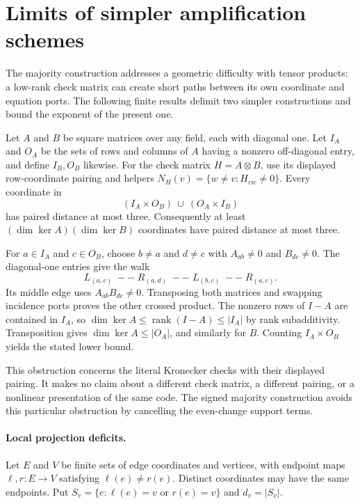 \section{Limits of simpler amplification schemes}\label{sec:barriers}

The majority construction addresses a geometric difficulty with tensor
products: a low-rank check matrix can create short paths between its
own coordinate and equation ports. The following finite results delimit
two simpler constructions and bound the exponent of the present one.

\begin{proposition}\label{prop:tensor-barrier}
Let $A$ and $B$ be square matrices over any field, each with diagonal
one. Let $I_A$ and $O_A$ be the sets of rows and columns of $A$ having
a nonzero off-diagonal entry, and define $I_B,O_B$ likewise. For the
check matrix $H=A\otimes B$, use its displayed row-coordinate pairing
and helpers $N_H(v)=\{w\ne v:H_{vw}\ne0\}$.
Every coordinate in
\[
 (I_A\times O_B)\ \cup\ (O_A\times I_B)
\]
has paired distance at most three. Consequently at least
$(\dim\ker A)(\dim\ker B)$ coordinates have paired distance at
most three.
\end{proposition}
\begin{outline}
For $a\in I_A$ and $c\in O_B$, choose $b\ne a$ and $d\ne c$ with
$A_{ab}\ne0$ and $B_{dc}\ne0$. The diagonal-one entries give the walk
\[
 L_{(a,c)}\;--\;R_{(a,d)}\;--\;L_{(b,c)}\;--\;R_{(a,c)}.
\]
Its middle edge uses $A_{ab}B_{dc}\ne0$. Transposing both matrices
and swapping incidence ports proves the other crossed product.
The nonzero rows of $I-A$ are contained in $I_A$, so
$\dim\ker A\le\operatorname{rank}(I-A)\le|I_A|$ by rank
subadditivity. Transposition gives $\dim\ker A\le|O_A|$, and
similarly for $B$. Counting $I_A\times O_B$ yields the stated lower
bound.
\end{outline}

This obstruction concerns the literal Kronecker checks with their
displayed pairing. It makes no claim about a different check matrix,
a different pairing, or a nonlinear presentation of the same code.
The signed majority construction avoids this particular obstruction
by cancelling the even-change support terms.

\paragraph{Local projection deficits.}
Let $E$ and $V$ be finite sets of edge coordinates and vertices, with endpoint maps
$\ell,r:E\to V$ satisfying $\ell(e)\ne r(e)$. Distinct coordinates
may have the same endpoints. Put
$S_v=\{e:\ell(e)=v\text{ or }r(e)=v\}$ and $d_v=|S_v|$.

